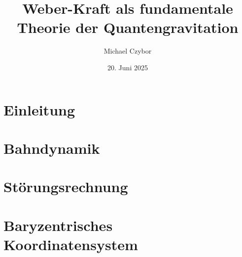 \documentclass{book}
\title{Weber-Kraft als fundamentale Theorie der Quantengravitation}
\author{Michael Czybor}
\date{20. Juni 2025}
\begin{document}
\cleardoublepage
{}
\maketitle
\tableofcontents
\cleardoublepage
\setcounter{page}{1}
\chapter{Einleitung}

















\chapter{Bahndynamik}










\chapter{Störungsrechnung}






\chapter{Baryzentrisches Koordinatensystem}




\end{document}
